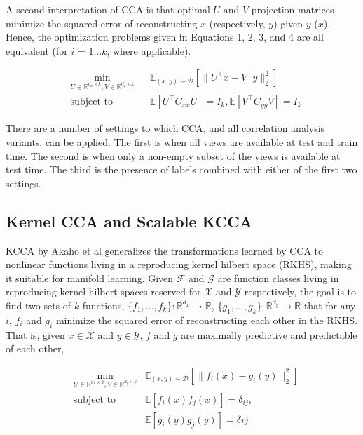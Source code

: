 \documentclass{article} %
\begin{document}
A second interpretation of CCA is that optimal $U$ and $V$ projection matrices minimize the squared error of reconstructing $x$ (respectively, $y$) given $y$ ($x$). Hence, the optimization problems given in Equations 1, 2, 3, and 4 are all equivalent (for $i$ = 1...$k$, where applicable).

\begin{equation}
\begin{aligned}
& \underset{U \in \mathbb{R}^{d_x \times k}, V \in \mathbb{R}^{d_y \times k}}{\text{min}}
& & \mathbb{E}_{(x, y) \sim \mathcal{D}}\left[ \|U^{\top}x - V^{\top}y\|_2^2 \right] \\
& \text{subject to}
& & \mathbb{E}[U^{\top}C_{xx}U] = I_k, \mathbb{E}[V^{\top}C_{yy}V] = I_k
\end{aligned}
\end{equation}

There are a number of settings to which CCA, and all correlation analysis variants, can be applied. The first is when all views are available at test and train time. The second is when only a non-empty subset of the views is available at test time. The third is the presence of labels combined with either of the first two settings. 

\subsection{Kernel CCA and Scalable KCCA}
KCCA by Akaho et al generalizes the transformations learned by CCA to nonlinear functions living in a reproducing kernel hilbert space (RKHS), making it suitable for manifold learning. Given $\mathcal{F}$ and $\mathcal{G}$ are function classes living in reproducing kernel hilbert spaces reserved for $\mathcal{X}$ and $\mathcal{Y}$ respectively, the goal is to find two sets of $k$ functions, $\{f_1, ..., f_k\} : \mathbb{R}^{d_x} \rightarrow \mathbb{R}$, $\{g_1, ..., g_k\} : \mathbb{R}^{d_y} \rightarrow \mathbb{R}$ that for any $i$, $f_i$ and $g_i$ minimize the squared error of reconstructing each other in the RKHS.  That is, given $x \in \mathcal{X}$ and $y \in \mathcal{Y}$, $f$ and $g$ are maximally predictive  and predictable of each other, 

\begin{equation}
\begin{aligned}
& \underset{U \in \mathbb{R}^{d_x \times k}, V \in \mathbb{R}^{d_y \times k}}{\text{min}}
& \mathbb{E}_{(x, y) \sim \mathcal{D}}\left[ \|f_i(x) - g_i(y)\|_2^2 \right] \\
& \text{subject to}
& \mathbb{E}[f_i(x)f_j(x)] = \delta_{ij}, \\
& & \mathbb{E}[g_i(y)g_j(y)] = \delta{ij}
\end{aligned}
\end{equation}
\end{document}
